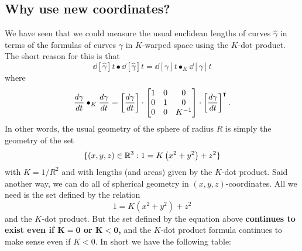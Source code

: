 \documentclass[newpage,hints,handout,noauthor,nooutcomes,12pt]{ximera}
\begin{document}
\subsection{Why use new coordinates?}

We have seen that we could measure the usual euclidean lengths of
curves $\hat{\gamma}$ in terms of the formulas of curves $\gamma$ in $K$-warped
space using the $K$-dot product. The short reason for this is that
\[
\dd[\hat{\gamma}]{t}\bullet\dd[\hat{\gamma}]{t}=\dd[\gamma]{t}\bullet_{K}\dd[\gamma]{t}
\]
where
\[
\dd[\gamma]{t}\bullet_{K}\dd[\gamma]{t}
=\left[\dd[\gamma]{t}\right]\cdot\begin{bmatrix}
1 & 0 & 0\\
0 & 1 & 0\\
0 & 0 & K^{-1}%
\end{bmatrix}
\cdot\left[\dd[\gamma]{t}\right]^\transpose.
\]
In other words, the usual geometry of the sphere of radius $R$ is
simply the geometry of the set
\[
\{(x,y,z)\in\mathbb R^3:1 = K\left(x^2 + y^2\right) +z^2\}
\]
with $K=1/R^{2}$ and with lengths (and areas) given by the $K$-dot
product. Said another way, we can do all of spherical geometry in
$(x,y,z)$-coordinates. All we need is the set defined by the relation
\[
1 = K\left(x^2 + y^2\right) +z^2
\]
and the $K$-dot product. But the set defined by the equation above
\textbf{continues to exist even if $\boldsymbol{K=0}$ or
  $\boldsymbol{K<0}$,} and the $K$-dot product formula continues to
make sense even if $K<0$. In short we have the following table:
\end{document}

